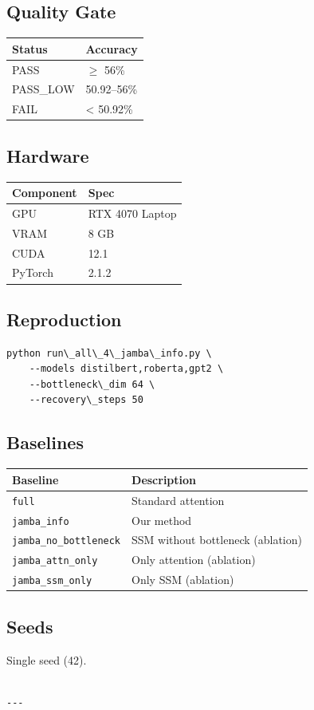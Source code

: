 \subsection{Quality Gate}

\begin{table}[H]
\centering
\small
\begin{tabular}{ll}
\toprule
\textbf{Status} & \textbf{Accuracy} \\
\midrule
PASS & $\ge$ 56\% \\
PASS\_LOW & 50.92--56\% \\
FAIL & \textless{} 50.92\% \\
\bottomrule
\end{tabular}
\end{table}

\subsection{Hardware}

\begin{table}[H]
\centering
\small
\begin{tabular}{ll}
\toprule
\textbf{Component} & \textbf{Spec} \\
\midrule
GPU & RTX 4070 Laptop \\
VRAM & 8 GB \\
CUDA & 12.1 \\
PyTorch & 2.1.2 \\
\bottomrule
\end{tabular}
\end{table}

\subsection{Reproduction}

\begin{lstlisting}
python run\_all\_4\_jamba\_info.py \
    --models distilbert,roberta,gpt2 \
    --bottleneck\_dim 64 \
    --recovery\_steps 50
\end{lstlisting}

\subsection{Baselines}

\begin{table}[H]
\centering
\small
\begin{tabular}{ll}
\toprule
\textbf{Baseline} & \textbf{Description} \\
\midrule
\texttt{full} & Standard attention \\
\texttt{jamba\_info} & Our method \\
\texttt{jamba\_no\_bottleneck} & SSM without bottleneck (ablation) \\
\texttt{jamba\_attn\_only} & Only attention (ablation) \\
\texttt{jamba\_ssm\_only} & Only SSM (ablation) \\
\bottomrule
\end{tabular}
\end{table}

\subsection{Seeds}

Single seed (42).
\begin{lstlisting}

---
\end{lstlisting}